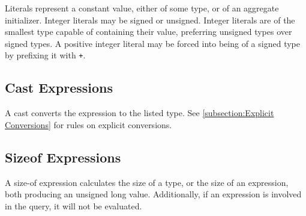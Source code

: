 \documentclass[letterpaper,12pt]{book}
\begin{document}
Literals represent a constant value, either of some type, or of an aggregate initializer. Integer literals may be signed or unsigned. Integer literals are of the smallest type capable of containing their value, preferring unsigned types over signed types. A positive integer literal may be forced into being of a signed type by prefixing it with \texttt{+}.

\subsection{Cast Expressions}

A cast converts the expression to the listed type. See \ref{subsection:Explicit Conversions} for rules on explicit conversions.

\subsection{Sizeof Expressions}

A size-of expression calculates the size of a type, or the size of an expression, both producing an unsigned long value. Additionally, if an expression is involved in the query, it will not be evaluated.
\end{document}
